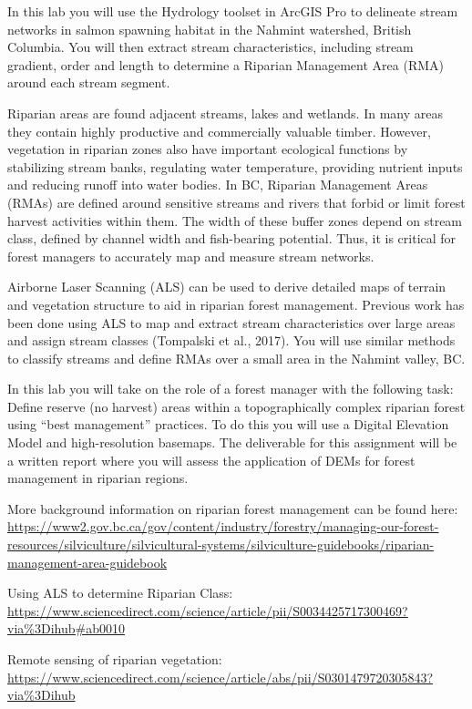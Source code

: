 \documentclass[
]{book}
\begin{document}
In this lab you will use the Hydrology toolset in ArcGIS Pro to delineate stream networks in salmon spawning habitat in the Nahmint watershed, British Columbia. You will then extract stream characteristics, including stream gradient, order and length to determine a Riparian Management Area (RMA) around each stream segment.

Riparian areas are found adjacent streams, lakes and wetlands. In many areas they contain highly productive and commercially valuable timber. However, vegetation in riparian zones also have important ecological functions by stabilizing stream banks, regulating water temperature, providing nutrient inputs and reducing runoff into water bodies. In BC, Riparian Management Areas (RMAs) are defined around sensitive streams and rivers that forbid or limit forest harvest activities within them. The width of these buffer zones depend on stream class, defined by channel width and fish-bearing potential. Thus, it is critical for forest managers to accurately map and measure stream networks.

Airborne Laser Scanning (ALS) can be used to derive detailed maps of terrain and vegetation structure to aid in riparian forest management. Previous work has been done using ALS to map and extract stream characteristics over large areas and assign stream classes (Tompalski et al., 2017). You will use similar methods to classify streams and define RMAs over a small area in the Nahmint valley, BC.

In this lab you will take on the role of a forest manager with the following task: Define reserve (no harvest) areas within a topographically complex riparian forest using ``best management'' practices. To do this you will use a Digital Elevation Model and high-resolution basemaps. The deliverable for this assignment will be a written report where you will assess the application of DEMs for forest management in riparian regions.

More background information on riparian forest management can be found here: \url{https://www2.gov.bc.ca/gov/content/industry/forestry/managing-our-forest-resources/silviculture/silvicultural-systems/silviculture-guidebooks/riparian-management-area-guidebook}

Using ALS to determine Riparian Class: \url{https://www.sciencedirect.com/science/article/pii/S0034425717300469?via\%3Dihub\#ab0010}

Remote sensing of riparian vegetation: \url{https://www.sciencedirect.com/science/article/abs/pii/S0301479720305843?via\%3Dihub}
\end{document}
